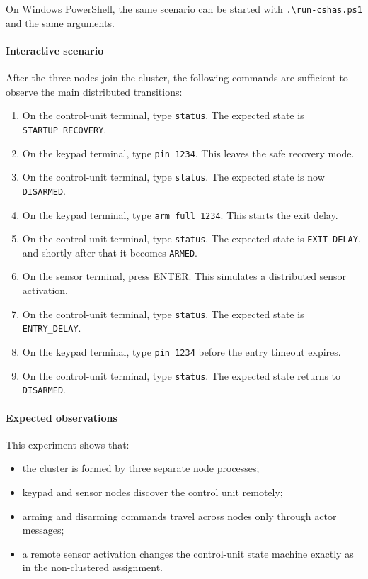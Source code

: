 On Windows PowerShell, the same scenario can be started with
\texttt{.\textbackslash run-cshas.ps1} and the same arguments.

\paragraph{Interactive scenario}
After the three nodes join the cluster, the following commands are sufficient
to observe the main distributed transitions:
\begin{enumerate}
    \item On the control-unit terminal, type \texttt{status}. The expected state is \texttt{STARTUP\_RECOVERY}.
    \item On the keypad terminal, type \texttt{pin 1234}. This leaves the safe recovery mode.
    \item On the control-unit terminal, type \texttt{status}. The expected state is now \texttt{DISARMED}.
    \item On the keypad terminal, type \texttt{arm full 1234}. This starts the exit delay.
    \item On the control-unit terminal, type \texttt{status}. The expected state is \texttt{EXIT\_DELAY}, and shortly after that it becomes \texttt{ARMED}.
    \item On the sensor terminal, press ENTER. This simulates a distributed sensor activation.
    \item On the control-unit terminal, type \texttt{status}. The expected state is \texttt{ENTRY\_DELAY}.
    \item On the keypad terminal, type \texttt{pin 1234} before the entry timeout expires.
    \item On the control-unit terminal, type \texttt{status}. The expected state returns to \texttt{DISARMED}.
\end{enumerate}

\paragraph{Expected observations}
This experiment shows that:
\begin{itemize}
    \item the cluster is formed by three separate node processes;
    \item keypad and sensor nodes discover the control unit remotely;
    \item arming and disarming commands travel across nodes only through actor messages;
    \item a remote sensor activation changes the control-unit state machine exactly as in the non-clustered assignment.
\end{itemize}
